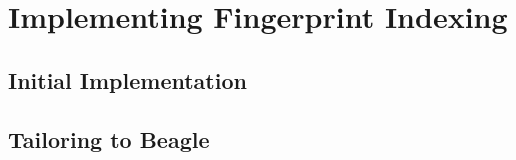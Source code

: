 
\chapter{Implementing Fingerprint Indexing}
\label{cha:method}

\section{Initial Implementation}
\label{sec:initial}

\section{Tailoring to Beagle}
\label{sec:tailored}

